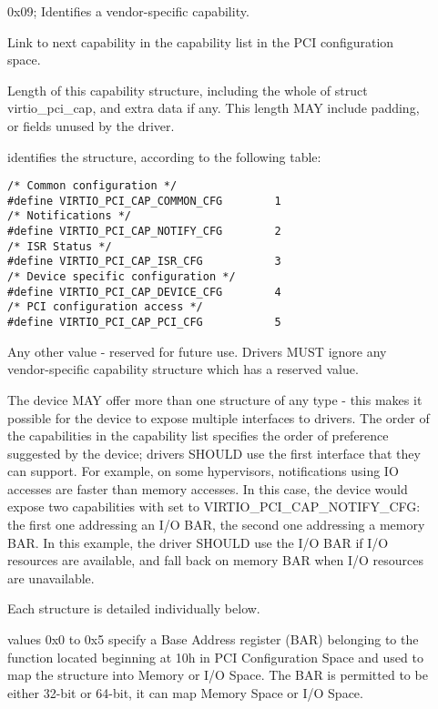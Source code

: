 \begin{description}
\item[]
        0x09; Identifies a vendor-specific capability.

\item[]
        Link to next capability in the capability list in the PCI configuration space.

\item[]
        Length of this capability structure, including the whole of
        struct virtio_pci_cap, and extra data if any.
        This length MAY include padding, or fields unused by the driver.

\item[]
        identifies the structure, according to the following table:

\begin{lstlisting}
/* Common configuration */
#define VIRTIO_PCI_CAP_COMMON_CFG        1
/* Notifications */
#define VIRTIO_PCI_CAP_NOTIFY_CFG        2
/* ISR Status */
#define VIRTIO_PCI_CAP_ISR_CFG           3
/* Device specific configuration */
#define VIRTIO_PCI_CAP_DEVICE_CFG        4
/* PCI configuration access */
#define VIRTIO_PCI_CAP_PCI_CFG           5
\end{lstlisting}

        Any other value - reserved for future use. Drivers MUST
        ignore any vendor-specific capability structure which has
        a reserved  value.

        The device MAY offer more than one structure of any type - this makes it
        possible for the device to expose multiple interfaces to drivers.  The order of
        the capabilities in the capability list specifies the order of preference
        suggested by the device; drivers SHOULD use the first interface that they can
        support.  For example, on some hypervisors, notifications using IO accesses are
        faster than memory accesses. In this case, the device would expose two
        capabilities with  set to VIRTIO_PCI_CAP_NOTIFY_CFG:
        the first one addressing an I/O BAR, the second one addressing a memory BAR.
        In this example, the driver SHOULD use the I/O BAR if I/O resources are available, and fall back on
        memory BAR when I/O resources are unavailable.

        Each structure is detailed individually below.

\item[]
        values 0x0 to 0x5 specify a Base Address register (BAR) belonging to
        the function located beginning at 10h in PCI Configuration Space
        and used to map the structure into Memory or I/O Space.
        The BAR is permitted to be either 32-bit or 64-bit, it can map Memory Space
        or I/O Space.


\end{description}
